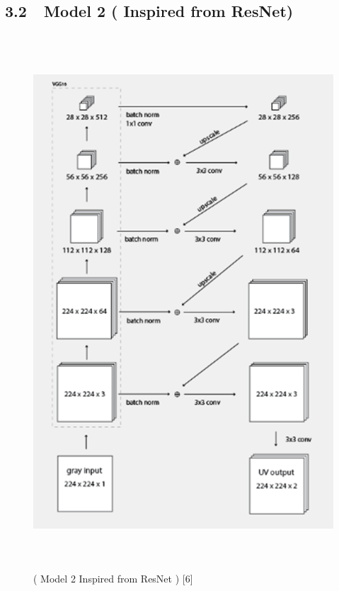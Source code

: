 \documentclass[12pt]{article}
\begin{document}
\subsection*{3.2\ \  \hspace*{10pt}Model 2 ( Inspired from ResNet)}
\begin{Center}



\begin{figure}[H]
	\begin{Center}
		\includegraphics[width=5.2in,height=7.86in]{./media/image9.png}
		\caption{( Model 2 Inspired from ResNet ) [6]}
		\label{fig:( Model 2 Inspired from ResNet ) [6]}
	\end{Center}
\end{figure}



\\

\end{Center}\par
\end{document}
